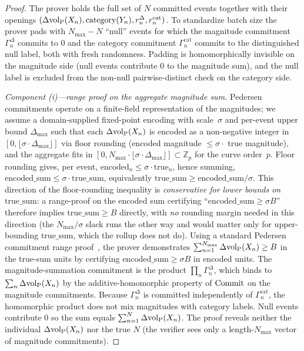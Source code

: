 \begin{proof}
The prover holds the full set of $N$ committed events together
with their openings $(\Delta{\operatorname{vol}_{\mathrm{P}}}(X_n), \mathrm{category}(Y_{n}), r^{\Delta}_n,
r^{\mathrm{cat}}_n)$.  To standardize batch size the prover
pads with $N_{\max} - N$ ``null'' events for which the magnitude
commitment $\Gamma^{\Delta}_n$ commits to $0$ and the category
commitment $\Gamma^{\mathrm{cat}}_n$ commits to the
distinguished null label, both with fresh randomness.  Padding
is homomorphically invisible on the magnitude side (null
events contribute $0$ to the magnitude sum), and the null
label is excluded from the non-null pairwise-distinct check on
the category side.

\emph{Component (i)---range proof on the aggregate magnitude
sum.}
Pedersen commitments operate on a finite-field representation
of the magnitudes; we assume a domain-supplied fixed-point
encoding with scale~$\sigma$ and per-event upper bound
$\Delta_{\max}$ such that each $\Delta{\operatorname{vol}_{\mathrm{P}}}(X_n)$ is encoded
as a non-negative integer in $[0, \lfloor \sigma \cdot
\Delta_{\max} \rfloor]$ via floor rounding (encoded
magnitude $\leq \sigma \cdot$ true magnitude), and the
aggregate fits in $[0, N_{\max} \cdot \lfloor \sigma \cdot
\Delta_{\max} \rfloor] \subset \mathbb{Z}_p$ for the curve
order~$p$.  Floor rounding gives, per event,
$\mathrm{encoded}_n \leq \sigma \cdot \mathrm{true}_n$, hence
summing,
$\mathrm{encoded\_sum} \leq \sigma \cdot \mathrm{true\_sum}$,
equivalently
$\mathrm{true\_sum} \geq \mathrm{encoded\_sum}/\sigma$.
This direction of the floor-rounding inequality is
\emph{conservative for lower bounds on $\mathrm{true\_sum}$}:
a range-proof on the encoded sum certifying
``$\mathrm{encoded\_sum} \geq \sigma B$''
therefore implies $\mathrm{true\_sum} \geq B$ directly, with
\emph{no} rounding margin needed in this direction (the
$N_{\max}/\sigma$ slack runs the other way and would matter
only for upper-bounding $\mathrm{true\_sum}$, which the rollup
does not do).  Using a standard Pedersen commitment range
proof~\citep[Definition~7]{lasser2026exo}, the prover
demonstrates
$\sum_{n=1}^{N_{\max}} \Delta{\operatorname{vol}_{\mathrm{P}}}(X_n) \geq B$ in the
true-sum units by certifying
$\mathrm{encoded\_sum} \geq \sigma B$ in encoded units.  The
magnitude-summation commitment is the product
$\prod_n \Gamma^{\Delta}_n$, which binds to
$\sum_n \Delta{\operatorname{vol}_{\mathrm{P}}}(X_n)$ by the additive-homomorphic property
of $\mathrm{Commit}$ on the magnitude commitments.  Because
$\Gamma^{\Delta}_n$ is committed independently of
$\Gamma^{\mathrm{cat}}_n$, the homomorphic product does not
mix magnitudes with category labels.  Null events contribute
$0$ so the sum equals $\sum_{n=1}^N \Delta{\operatorname{vol}_{\mathrm{P}}}(X_n)$.  The
proof reveals neither the individual $\Delta{\operatorname{vol}_{\mathrm{P}}}(X_n)$ nor
the true $N$ (the verifier sees only a length-$N_{\max}$
vector of magnitude commitments).


\end{proof}
